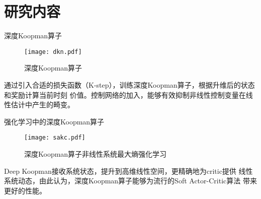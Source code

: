 \documentclass{ldr-simple-gray}
\begin{document}
\section{研究内容}

%     

\begin{frame}{深度Koopman算子}
  \begin{figure}
    \texttt{[image: dkn.pdf]}
    \caption{深度Koopman算子}
  \end{figure}
  通过引入合适的损失函数（K-step），训练深度Koopman算子，根据升维后的状态和奖励计算当前时刻
  价值。控制网络的加入，能够有效抑制非线性控制变量在线性估计中产生的畸变。
\end{frame}

\begin{frame}{强化学习中的深度Koopman算子}
  \begin{figure}
    \texttt{[image: sakc.pdf]}
    \caption{深度Koopman算子非线性系统最大熵强化学习}
  \end{figure}
  Deep Koopman接收系统状态，提升到高维线性空间，更精确地为critic提供
  线性系统动态，由此认为，深度Koopman算子能够为流行的Soft Actor-Critic算法
  带来更好的性能。
\end{frame}
\end{document}
